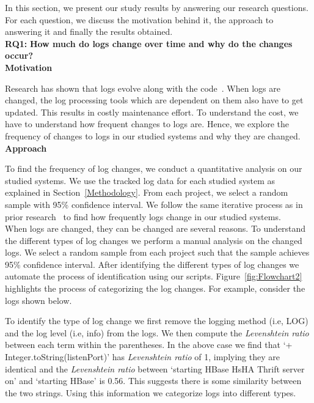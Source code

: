 In this section, we present our study results by answering our research questions. For each question, we discuss the motivation behind it, the approach to answering it and finally the results obtained. 
\\

\noindent\textbf{RQ1:} \textbf{How much do logs change over time and why do the changes occur?}
\\

\noindent\textbf{Motivation}

Research has shown that logs evolve along with the code~\cite{IanContextinformation}. When logs are changed, the log  processing tools which are dependent on them also have to get updated. This results in costly maintenance effort. To understand the cost, we have to understand how frequent changes to logs are. Hence, we explore the frequency of changes to logs in our studied systems and why they are changed.\\

\noindent \textbf{Approach}

To find the frequency of log changes, we conduct a quantitative analysis on our studied systems. We use the tracked log data for each studied system as explained in Section~\ref{Methodology}. From each project, we select a random sample with 95\% confidence interval. We follow the same iterative process as in prior research~\cite{IanIcesm} to find how frequently logs change in our studied systems. \\

When logs are changed, they can be changed are several reasons. To understand the different types of log changes we perform a manual analysis on the changed logs. We select a random sample from each project such that the sample achieves 95\% confidence interval. After identifying the different types of log changes we automate the process of identification using our scripts. Figure~\ref{fig:Flowchart2} highlights the process of categorizing the log changes. For example, 
consider the logs shown below. 




To identify the type of log change we first remove the logging method (i.e, LOG) and the log level (i.e, info) from the logs. We then compute the \textsl{Levenshtein ratio} between each term within the parentheses. In the above case we find that `+ Integer.toString(listenPort)' has \textsl{Levenshtein ratio} of 1, implying they are identical and the \textsl{Levenshtein ratio} between `starting HBase HsHA Thrift server on' and `starting HBase' is 0.56. This suggests there is some similarity between the two strings. Using this information we categorize logs into different types.

